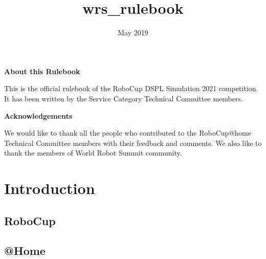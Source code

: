 \documentclass{article}
\title{wrs_rulebook}
\date{May 2019}
\makeatletter
\newcommand\abtname{About this Rulebook}
\newenvironment{about}{%
       \titlepage
       \null\vfil
       \@beginparpenalty\@lowpenalty
       \begin{center}%
         \bfseries \abtname
         \@endparpenalty\@M
       \end{center}}%
      {\par\vfil\null\endtitlepage}
\newenvironment{about}{%
       \if@twocolumn
         \section*{\abstractname}%
       \else
         \small
         \begin{center}%
           {\bfseries \abtname\vspace{-.5em}\vspace{\z@}}%
         \end{center}%
         \quotation
       \fi}
       {\if@twocolumn\else\endquotation\fi}
\newcommand\ackname{Acknowledgements}
\newenvironment{acknowledgements}{%
       \titlepage
       \null\vfil
       \@beginparpenalty\@lowpenalty
       \begin{center}%
         \bfseries \ackname
         \@endparpenalty\@M
       \end{center}}%
      {\par\vfil\null\endtitlepage}
\newenvironment{acknowledgements}{%
       \if@twocolumn
         \section*{\abstractname}%
       \else
         \small
         \begin{center}%
           {\bfseries \ackname\vspace{-.5em}\vspace{\z@}}%
         \end{center}%
         \quotation
       \fi}
       {\if@twocolumn\else\endquotation\fi}
\makeatother
\begin{document}
\begin{titlepage}
	\centering
	{\scshape\LARGE RoboCup2021\par}
	\vspace{1cm}
	{\scshape\Large @Home\par}
	\vspace{1.5cm}
	{\huge\bfseries Simulation DSLP\par}
	\vspace{2cm}
	{\Large\itshape Rules \& Regulations\par}
	\vfill
	\texttt{[image: \{images/real01.png]}}
	\vfill
	
{\large Version 0.0.0 (January 25, 2021)}
\end{titlepage}

\newpage

\begin{about}

This is the official rulebook of the RoboCup DSPL Simulation 2021 competition. It has been written by the Service Category Technical Committee members.

\end{about}

\begin{acknowledgements}

We would like to thank all the people who contributed to the RoboCup@home Technical Committee members with their feedback and comments. We also like to thank the members of World Robot Summit community.


\end{acknowledgements}

\newpage
{}
\tableofcontents{}
\singlespacing
\newpage

\section{Introduction}

\subsection{RoboCup}


\subsection{@Home}
\end{document}
